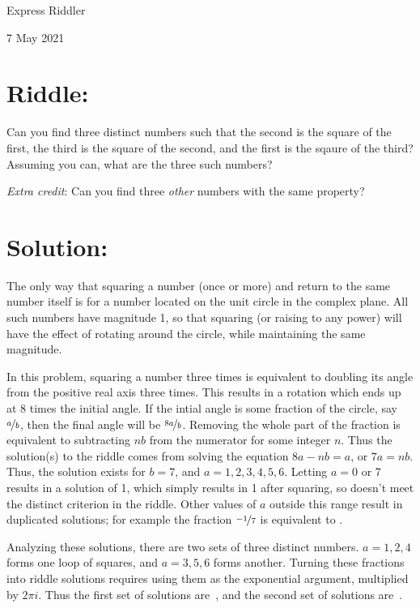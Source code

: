 \documentclass{article}
\begin{document}
\pagestyle{empty} %

\begin{center}
{\LARGE Express Riddler}

\vspace{0.15in}

{\Large 7 May 2021}
\end{center}


\section*{Riddle:}

Can you find three distinct numbers such that the second is the square of the first, the third is the square of the second, and the first is the sqaure of the third?
Assuming you can, what are the three such numbers?

\textit{Extra credit}: Can you find three \textit{other} numbers with the same property?



\section*{Solution:}

The only way that squaring a number (once or more) and return to the same number itself is for a number located on the unit circle in the complex plane.
All such numbers have magnitude 1, so that squaring (or raising to any power) will have the effect of rotating around the circle, while maintaining the same magnitude.

In this problem, squaring a number three times is equivalent to doubling its angle from the positive real axis three times.
This results in a rotation which ends up at 8 times the initial angle.
If the intial angle is some fraction of the circle, say $\nicefrac{a}{b}$, then the final angle will be $\nicefrac{8a}{b}$.
Removing the whole part of the fraction is equivalent to subtracting $nb$ from the numerator for some integer $n$.
Thus the solution(s) to the riddle comes from solving the equation $8a-nb=a$, or $7a=nb$.
Thus, the solution exists for $b=7$, and $a=1,2,3,4,5,6$.
Letting $a=0$ or 7 results in a solution of 1, which simply results in 1 after squaring, so doesn't meet the distinct criterion in the riddle.
Other values of $a$ outside this range result in duplicated solutions; for example the fraction $\nicefrac{-1}{7}$ is equivalent to .

Analyzing these solutions, there are two sets of three distinct numbers.
$a=1,2,4$ forms one loop of squares, and $a=3,5,6$ forms another.
Turning these fractions into riddle solutions requires using them as the exponential argument, multiplied by $2\pi i$.
Thus the first set of solutions are
\,, and the second set of solutions are
\,.
\end{document}
